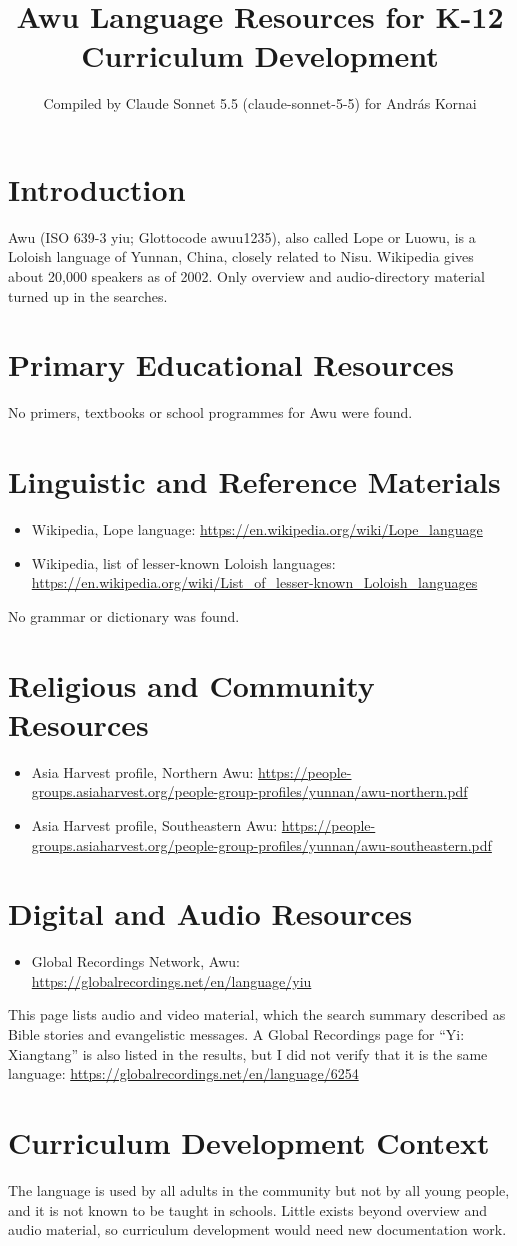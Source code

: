 \documentclass[12pt]{article}
\title{Awu Language Resources for K-12 Curriculum Development}
\author{Compiled by Claude Sonnet 5.5 (claude-sonnet-5-5) for Andr\'as Kornai}
\date{}
\begin{document}
\maketitle

\section{Introduction}
Awu (ISO 639-3 yiu; Glottocode awuu1235), also called Lope or Luowu, is a Loloish language of Yunnan, China, closely related to Nisu. Wikipedia gives about 20,000 speakers as of 2002. Only overview and audio-directory material turned up in the searches.

\section{Primary Educational Resources}
No primers, textbooks or school programmes for Awu were found.

\section{Linguistic and Reference Materials}
\begin{itemize}
\item Wikipedia, Lope language: \url{https://en.wikipedia.org/wiki/Lope_language}
\item Wikipedia, list of lesser-known Loloish languages: \url{https://en.wikipedia.org/wiki/List_of_lesser-known_Loloish_languages}
\end{itemize}
No grammar or dictionary was found.

\section{Religious and Community Resources}
\begin{itemize}
\item Asia Harvest profile, Northern Awu: \url{https://people-groups.asiaharvest.org/people-group-profiles/yunnan/awu-northern.pdf}
\item Asia Harvest profile, Southeastern Awu: \url{https://people-groups.asiaharvest.org/people-group-profiles/yunnan/awu-southeastern.pdf}
\end{itemize}

\section{Digital and Audio Resources}
\begin{itemize}
\item Global Recordings Network, Awu: \url{https://globalrecordings.net/en/language/yiu}
\end{itemize}
This page lists audio and video material, which the search summary described as Bible stories and evangelistic messages. A Global Recordings page for ``Yi: Xiangtang'' is also listed in the results, but I did not verify that it is the same language: \url{https://globalrecordings.net/en/language/6254}

\section{Curriculum Development Context}
The language is used by all adults in the community but not by all young people, and it is not known to be taught in schools. Little exists beyond overview and audio material, so curriculum development would need new documentation work.
\end{document}
